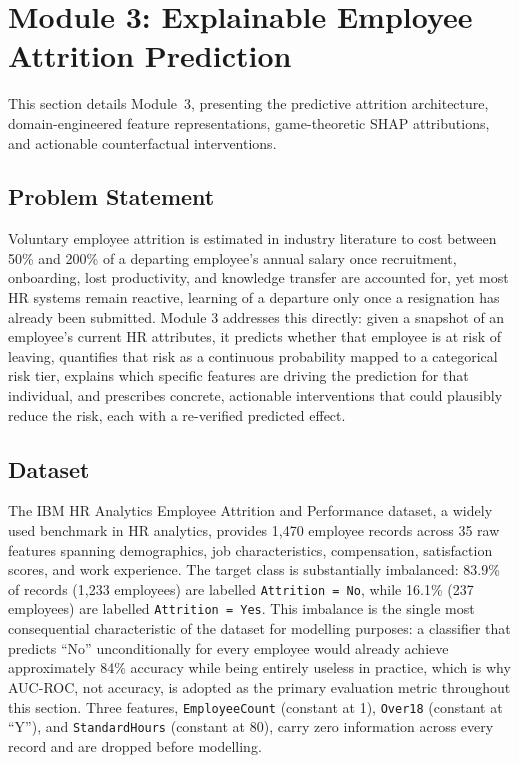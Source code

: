 \documentclass[11pt,a4paper]{article}
\newcommand{\code}[1]{\texttt{\footnotesize #1}}
\begin{document}
\section[Module 3: Attrition Prediction]{Module 3: Explainable Employee Attrition Prediction}
\label{sec:mod3}

This section details Module~3, presenting the predictive attrition architecture, domain-engineered feature representations, game-theoretic SHAP attributions, and actionable counterfactual interventions.

\subsection{Problem Statement}

Voluntary employee attrition is estimated in industry literature to cost between 50\% and 200\% of a departing employee's annual salary once recruitment, onboarding, lost productivity, and knowledge transfer are accounted for, yet most HR systems remain reactive, learning of a departure only once a resignation has already been submitted. Module 3 addresses this directly: given a snapshot of an employee's current HR attributes, it predicts whether that employee is at risk of leaving, quantifies that risk as a continuous probability mapped to a categorical risk tier, explains which specific features are driving the prediction for that individual, and prescribes concrete, actionable interventions that could plausibly reduce the risk, each with a re-verified predicted effect.

\subsection{Dataset}

The IBM HR Analytics Employee Attrition and Performance dataset, a widely used benchmark in HR analytics, provides 1{,}470 employee records across 35 raw features spanning demographics, job characteristics, compensation, satisfaction scores, and work experience. The target class is substantially imbalanced: 83.9\% of records (1{,}233 employees) are labelled \code{Attrition = No}, while 16.1\% (237 employees) are labelled \code{Attrition = Yes}. This imbalance is the single most consequential characteristic of the dataset for modelling purposes: a classifier that predicts ``No'' unconditionally for every employee would already achieve approximately 84\% accuracy while being entirely useless in practice, which is why AUC-ROC, not accuracy, is adopted as the primary evaluation metric throughout this section. Three features, \code{EmployeeCount} (constant at 1), \code{Over18} (constant at ``Y''), and \code{StandardHours} (constant at 80), carry zero information across every record and are dropped before modelling.
\end{document}
